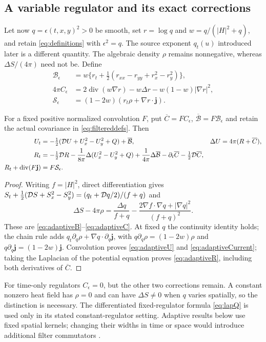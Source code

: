 \subsection{A variable regulator and its exact corrections}\label{sec:variable}
Let now $q=\epsilon(t,x,y)^2>0$ be smooth, set $r=\log q$ and
$w=q/(|H|^2+q)$, and retain \eqref{eq:definitions} with $\epsilon^2=q$.
The source exponent $q_t(u)$ introduced later is a different quantity.
The algebraic density $\rho$ remains nonnegative, whereas
$\Delta S/(4\pi)$ need not be. Define
\begin{align}
 \mathcal B_\epsilon&=w\{r_t+\tfrac12(r_{xx}-r_{yy}+r_x^2-r_y^2)\},
 \label{eq:adaptiveB}\\
 4\pi C_\epsilon&=2\operatorname{div}(w\nabla r)-w\Delta r
                     -w(1-w)|\nabla r|^2,\label{eq:adaptiveC}\\
 \mathcal S_\epsilon&=(1-2w)(r_t\rho+\nabla r\cdot\mathbf j).
 \label{eq:adaptiveSource}
\end{align}
\begin{proposition}\label{prop:adaptive}
For a fixed positive normalized convolution $F$, put
$\overline C=FC_\epsilon$, $\overline{\mathcal B}=F\mathcal B_\epsilon$
and retain the actual covariance in \eqref{eq:filtereddefs}. Then
\begin{align}
 U_t&=-\tfrac12(\mathcal D U+U_x^2-U_y^2+Q)+\overline{\mathcal B},
 &\Delta U&=4\pi(R+\overline C),\label{eq:adaptiveU}\\
 R_t&=-\tfrac12\mathcal D R-\frac1{8\pi}\Delta(U_x^2-U_y^2+Q)
       +\frac1{4\pi}\Delta\overline{\mathcal B}
       -\partial_t\overline C-\tfrac12\mathcal D\overline C,
 \label{eq:adaptiveR}\\
 R_t+\operatorname{div}(F\mathbf j)&=F\mathcal S_\epsilon.
 \label{eq:adaptiveCurrent}
\end{align}
\end{proposition}
\begin{proof}
Writing $f=|H|^2$, direct differentiation gives
$S_t+\tfrac12(\mathcal D S+S_x^2-S_y^2)=(q_t+\mathcal D q/2)/(f+q)$
and
\[
 \Delta S-4\pi\rho=\frac{\Delta q}{f+q}
 -\frac{2\nabla f\cdot\nabla q+|\nabla q|^2}{(f+q)^2}.
\]
These are \eqref{eq:adaptiveB}--\eqref{eq:adaptiveC}.
At fixed $q$ the continuity identity holds; the chain rule adds
$q_t\partial_q\rho+\nabla q\cdot\partial_q\mathbf j$, with
$q\partial_q\rho=(1-2w)\rho$ and
$q\partial_q\mathbf j=(1-2w)\mathbf j$.
Convolution proves \eqref{eq:adaptiveU} and \eqref{eq:adaptiveCurrent};
taking the Laplacian of the potential equation proves
\eqref{eq:adaptiveR}, including both derivatives of $\overline C$.
\end{proof}
For time-only regulators $C_\epsilon=0$, but the other two corrections
remain. A constant nonzero heat field has $\rho=0$ and can have
$\Delta S\ne0$ when $q$ varies spatially, so the distinction is necessary.
The differentiated fixed-regulator formula \eqref{eq:lapQ} is used only
in its stated constant-regulator setting. Adaptive results below use
fixed spatial kernels; changing their widths in time or space would
introduce additional filter commutators \cite{n14}.


